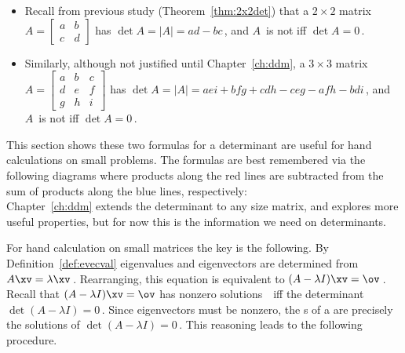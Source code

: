 \begin{itemize}
\item Recall from previous study (Theorem~\ref{thm:2x2det}) that a \(2\times 2\) matrix \(A=\begin{bmatrix} a&b\\c&d \end{bmatrix}\) has  \(\det A=|A|=ad-bc\)\,, and \(A\)~is not  iff \(\det A=0\)\,.
\item Similarly, although not justified until Chapter~\ref{ch:ddm}, a \(3\times 3\) matrix \(A=\begin{bmatrix} a&b&c\\d&e&f\\g&h&i \end{bmatrix}\) has  \(\det A=|A|=aei+bfg+cdh-ceg-afh-bdi\)\,, and \(A\)~is not  iff \(\det A=0\)\,.
\end{itemize}
This section shows these two formulas for a determinant are useful for hand calculations on small problems.
The formulas are best remembered via the following diagrams where products along the red lines are subtracted from the sum of products along the blue lines, respectively:
\begin{equation}

\label{eq:dets23}
\end{equation}
Chapter~\ref{ch:ddm} extends the determinant to any size matrix, and explores more useful properties, but for now this is the information we need on determinants.


For hand calculation on small matrices the key is the following.
By Definition~\ref{def:evecval} eigenvalues and eigenvectors are determined from \(A\xv=\lambda\xv\)\,.  
Rearranging, this equation is equivalent to \((A-\lambda I)\xv=\ov\)\,.  
Recall that \((A-\lambda I)\xv=\ov\) has nonzero solutions~\xv\ iff the determinant \(\det(A-\lambda I)=0\)\,.
Since eigenvectors must be nonzero, the s of a  are precisely the solutions of \(\det(A-\lambda I)=0\)\,. 
This reasoning leads to the following procedure.



